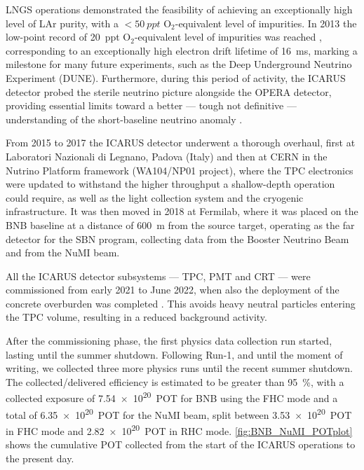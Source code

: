 LNGS operations demonstrated the feasibility of achieving an exceptionally high level of LAr purity, with a $<\SI{50}{ppt}$ O$_2$-equivalent level of impurities. In 2013 the low-point record of \SI{20}{ppt} O$_2$-equivalent level of impurities was reached \cite{antonelloExperimentalObservationExtremely2014}, corresponding to an exceptionally high electron drift lifetime of \SI{16}{\ms}, marking a milestone for many future experiments, such as the Deep Underground Neutrino Experiment (DUNE). Furthermore, during this period of activity, the ICARUS detector probed the sterile neutrino picture alongside the OPERA detector, providing essential limits toward a better --- tough not definitive --- understanding of the short-baseline neutrino anomaly \cite{antonelloSearchAnomaliesNeappearance2013, antonelloConclusiveConsiderationsComparison2015, agafonovaNewResultsNm2013}. 

From 2015 to 2017 the ICARUS detector underwent a thorough overhaul, first at Laboratori Nazionali di Legnano, Padova (Italy) and then at CERN in the Nutrino Platform framework (WA104/NP01 project), where the TPC electronics were updated to withstand the higher throughput a shallow-depth operation could require, as well as the light collection system and the cryogenic infrastructure. It was then moved in 2018 at Fermilab, where it was placed on the BNB baseline at a distance of \SI{600}{\m} from the source target, operating as the far detector for the SBN program, collecting data from the Booster Neutrino Beam and from the NuMI beam. 

All the ICARUS detector subsystems --- TPC, PMT and CRT --- were commissioned from early 2021 to June 2022, when also the deployment of the concrete overburden was completed \cite{abratenkoICARUSFermilabShortBaseline2023}. This avoids heavy neutral particles entering the TPC volume, resulting in a reduced background activity. 

After the commissioning phase, the first physics data collection run started, lasting until the summer shutdown. Following Run-1, and until the moment of writing, we collected three more physics runs until the recent summer shutdown. The collected/delivered efficiency is estimated to be greater than \SI{95}{\percent}, with a collected exposure of \SI{7.54e20}{POT} for BNB using the FHC mode and a total of \SI{6.35e20}{POT} for the NuMI beam, split between \SI{3.53e20}{POT} in FHC mode and \SI{2.82e20}{POT} in RHC mode. \autoref{fig:BNB_NuMI_POTplot} shows the cumulative POT collected from the start of the ICARUS operations to the present day. 

